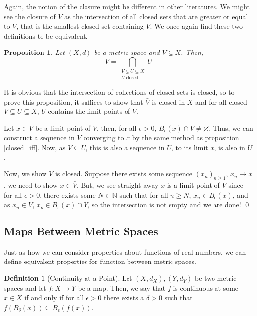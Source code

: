 \documentclass[
]{article}
\newtheorem{prop}{Proposition}
\theoremstyle{definition}
\newtheorem{definition}{Definition}[section]
\begin{document}
Again, the notion of the closure might be different in other
literatures. We might see the closure of \(V\) as the intersection of
all closed sets that are greater or equal to \(V\), that is the smallest
closed set containing \(V\). We once again find these two definitions to
be equivalent.

\begin{prop}
  Let \((X, d)\) be a metric space and \(V \subseteq X\). Then, 
  \[\bar{V} = \bigcap_{\substack{V \subseteq U \subseteq X \\ 
    U \mathop{\mathrm{closed}}}} U\]
\end{prop}
\proof

It is obvious that the intersection of collections of closed sets is
closed, so to prove this proposition, it suffices to show that
\(\bar{V}\) is closed in \(X\) and for all closed
\(V \subseteq U \subseteq X\), \(U\) contains the limit points of \(V\).

Let \(x \in V\) be a limit point of \(V\), then, for all
\(\epsilon > 0\), \(B_\epsilon(x) \cap V \neq \varnothing\). Thus, we
can construct a sequence in \(V\) converging to \(x\) by the same method
as proposition \ref{closed_iff}. Now, as \(V \subseteq U\), this is also
a sequence in \(U\), to its limit \(x\), is also in \(U\).

Now, we show \(\bar{V}\) is closed. Suppose there exists some sequence
\((x_n)_{n \ge 1}\), \(x_n \to x\), we need to show \(x \in \bar{V}\).
But, we see straight away \(x\) is a limit point of \(V\) since for all
\(\epsilon > 0\), there exists some \(N \in \mathbb{N}\) such that for
all \(n \ge N\), \(x_n \in B_\epsilon(x)\), and as \(x_n \in V\),
\(x_n \in B_\epsilon(x) \cap V\), so the intersection is not empty and
we are done! \qed

\hypertarget{maps-between-metric-spaces}{%
\subsection{Maps Between Metric
Spaces}\label{maps-between-metric-spaces}}

Just as how we can consider properties about functions of real numbers,
we can define equivalent properties for function between metric spaces.

\begin{definition}[Continuity at a Point]
  Let \((X, d_X), (Y, d_Y)\) be two metric spaces and let \(f : X \to Y\) be 
  a map. Then, we say that \(f\) is continuous at some \(x \in X\) if and only if 
  for all \(\epsilon > 0\) there exists a \(\delta > 0\) such that 
  \(f(B_\delta(x)) \subseteq B_\epsilon(f(x))\).  
\end{definition}
\end{document}
